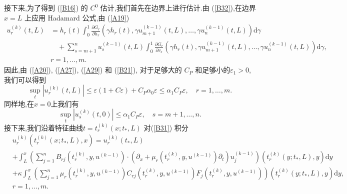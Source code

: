 \documentclass[notitlepage,cs4size,punct,oneside]{ctexrep}
\numberwithin{equation}{chapter}
\theoremstyle{mystyle}
\begin{document}
接下来,为了得到 (\ref{B16}) 的 $C^{0}$ 估计,我们首先在边界上进行估计.由 (\ref{B32}),在边界 $x = L$ 上应用 Hadamard 公式,由 (\ref{A19})
\begin{align}
    u_{r}^{(k)}(t, L) & =h_{r}(t) \int_{0}^{1} \frac{\partial G_{r}}{\partial h_{r}}\left(\gamma h_{r}(t), \gamma u_{m+1}^{(k-1)}(t, L), \ldots, \gamma u_{n}^{(k-1)}(t, L)\right) \mathrm{d} \gamma \nonumber                                    \\
                      & \quad  +\sum_{s=m+1}^{n} u_{s}^{(k-1)}(t, L) \int_{0}^{1} \frac{\partial G_{r}}{\partial v_{s}}\left(\gamma h_{r}(t), \gamma u_{m+1}^{(k-1)}(t, L), \ldots, \gamma u_{n}^{(k-1)}(t, L)\right) \mathrm{d} \gamma,\nonumber \\&  r=1, \ldots, m . \label{B36}
\end{align}
因此,由 (\ref{A20}), (\ref{A27}), (\ref{A29}) 和 (\ref{B21}), 对于足够大的 $C_{P}$ 和足够小的$\varepsilon_{1}>0$, 我们可以得到
\begin{equation} \label{B37}
    \sup _{t}\left|u_{r}^{(k)}(t, L)\right| \leq \varepsilon(1+C \varepsilon)+C_{P} \alpha_{0} \varepsilon \leq \alpha_{1} C_{P} \varepsilon, \quad r=1, \ldots, m.
\end{equation}
同样地,在$x=0$上我们有
\begin{equation} \label{B38}
    \sup _{t}\left|u_{s}^{(k)}(t, 0)\right| \leq \alpha_{1} C_{P} \varepsilon, \quad s=m+1, \ldots, n.
\end{equation}
接下来,我们沿着特征曲线$t=t_{r}^{(k)}\left(x ; t_{*}, L\right)$ 对(\ref{B31}) 积分
\begin{align}
    & u_{r}^{(k)}\left(t_{r}^{(k)}\left(x ; t_{*}, L\right), x\right)  =u_{r}^{(k)}\left(t_{*}, L\right) \nonumber                                                                                                                                                                     \\
                & +\int_{L}^{x}\left(\sum_{j=1}^{n} B_{r j}\left(t_{r}^{(k)}, y,u^{(k-1)}\right) \cdot\left(\partial_{x}+\mu_{r}\left(t_{r}^{(k)},y,u^{(k-1)}\right) \partial_{t}\right) u_{j}^{(k-1)}\right)\left(t_{r}^{(k)}\left(y ; t_{*}, L\right), y\right)\mathrm{d} y \nonumber \\
                & +\kappa \int_{L}^{x}\left(\sum _{j=1}^{n} \mu_{r}\left(t_{r}^{(k)}, y,u^{(k-1)}\right) C_{r j}(t_{r}^{(k)}, y,u^{(k-1)}) F_j(t_{r}^{(k)}, y,u^{(k-1)}) \right) \left(t_{r}^{(k)}\left(y ; t_{*}, L\right), y\right)\mathrm{d} y,\nonumber                             \\
                & r=1, \ldots, m .\label{B39}
\end{align}
\end{document}

